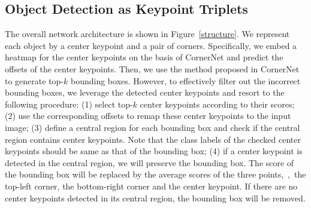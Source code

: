 \documentclass[10pt,twocolumn,letterpaper]{article}
\begin{document}
\subsection{Object Detection as Keypoint Triplets}\label{Triplets}
The overall network architecture is shown in Figure~\ref{structure}. We represent each object by a center keypoint and a pair of corners. Specifically, we embed a heatmap for the center keypoints on the basis of CornerNet and predict the offsets of the center keypoints. Then, we use the method proposed in CornerNet~\cite{law2018cornernet} to generate top-$k$ bounding boxes. However, to effectively filter out the incorrect bounding boxes, we leverage the detected center keypoints and resort to the following procedure: (1) select top-$k$ center keypoints according to their scores; (2) use the corresponding offsets to remap these center keypoints to the input image; (3) define a central region for each bounding box and check if the central region contains center keypoints. Note that the class labels of the checked center keypoints should be same as that of the bounding box; (4) if a center keypoint is detected in the central region, we will preserve the bounding box. The score of the bounding box will be replaced by the average scores of the three points,~\ie,~the top-left corner, the bottom-right corner and the center keypoint. If there are no center keypoints detected in its central region, the bounding box will be removed.
\end{document}
